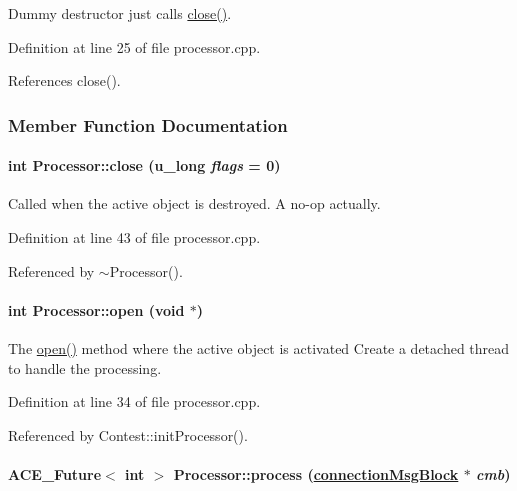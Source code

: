 Dummy destructor just calls \hyperlink{classProcessor_Processora3}{close()}. 

Definition at line 25 of file processor.cpp.

References close().

\subsubsection{Member Function Documentation}
\hypertarget{classProcessor_Processora3}{
\paragraph[close]{\setlength{\rightskip}{0pt plus 5cm}int Processor::close (u\_\-long {\em flags} = 0)}\hfill}
\label{classProcessor_Processora3}


Called when the active object is destroyed. A no-op actually. 

Definition at line 43 of file processor.cpp.

Referenced by $\sim$Processor().\hypertarget{classProcessor_Processora2}{
\paragraph[open]{\setlength{\rightskip}{0pt plus 5cm}int Processor::open (void $\ast$)}\hfill}
\label{classProcessor_Processora2}


The \hyperlink{classProcessor_Processora2}{open()} method where the active object is activated Create a detached thread to handle the processing. 

Definition at line 34 of file processor.cpp.

Referenced by Contest::init\-Processor().\hypertarget{classProcessor_Processora5}{
\paragraph[process]{\setlength{\rightskip}{0pt plus 5cm}ACE\_\-Future$<$ int $>$ Processor::process (\hyperlink{classconnectionMsgBlock}{connection\-Msg\-Block} $\ast$ {\em cmb})}\hfill}
\label{classProcessor_Processora5}


